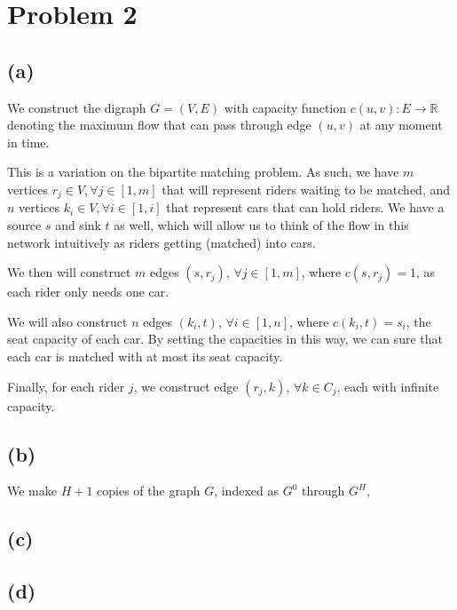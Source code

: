 \documentclass{6046}
\begin{document}
\section*{Problem 2}
\subsection*{(a)}
We construct the digraph $G = (V, E)$ with capacity function
$c(u, v): E \rightarrow \mathbb{R}$ denoting the
maximum flow that can pass through edge $(u, v)$ at
any moment in time.

This is a variation on the bipartite matching problem.
As such, we have $m$ vertices $r_j \in V, \forall
j \in [1, m]$ that will represent riders waiting to be
matched, and $n$ vertices $k_i \in V, \forall i \in
[1, i]$ that represent cars that
can hold riders. We have a source $s$ and
sink $t$ as well, which will allow us to think
of the flow in this network intuitively as riders
getting (matched) into cars.

We then will construct $m$ edges $(s, r_j)$, $\forall j \in [1, m]$,
where $c(s, r_j) = 1$, as each rider only needs one car.

We will also construct $n$ edges $(k_i, t)$, $\forall i \in [1, n]$,
where $c(k_i, t) = s_i$, the seat capacity of each car. By setting
the capacities in this way, we can sure that each car is matched with
at most its seat capacity.

Finally, for each rider $j$, we construct edge $(r_j, k)$, $\forall k \in C_j$,
each with infinite capacity. 

\subsection*{(b)}
We make $H + 1$ copies of the graph $G$, indexed as $G^0$
through $G^H$, 


\subsection*{(c)}


\subsection*{(d)}
\end{document}
